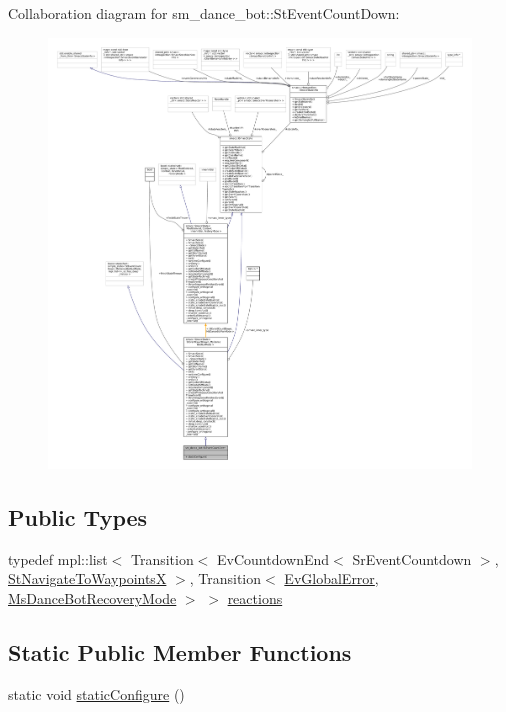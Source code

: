 Collaboration diagram for sm\+\_\+dance\+\_\+bot\+:\+:St\+Event\+Count\+Down\+:
\nopagebreak
\begin{figure}[H]
\begin{center}
\leavevmode
\includegraphics[width=350pt]{structsm__dance__bot_1_1StEventCountDown__coll__graph}
\end{center}
\end{figure}
\subsection*{Public Types}
\begin{DoxyCompactItemize}
\item 
typedef mpl\+::list$<$ Transition$<$ Ev\+Countdown\+End$<$ Sr\+Event\+Countdown $>$, \hyperlink{structsm__dance__bot_1_1StNavigateToWaypointsX}{St\+Navigate\+To\+WaypointsX} $>$, Transition$<$ \hyperlink{structsm__dance__bot_1_1EvGlobalError}{Ev\+Global\+Error}, \hyperlink{classsm__dance__bot_1_1MsDanceBotRecoveryMode}{Ms\+Dance\+Bot\+Recovery\+Mode} $>$ $>$ \hyperlink{structsm__dance__bot_1_1StEventCountDown_a19070a7928050e2ecfc234de07903c59}{reactions}
\end{DoxyCompactItemize}
\subsection*{Static Public Member Functions}
\begin{DoxyCompactItemize}
\item 
static void \hyperlink{structsm__dance__bot_1_1StEventCountDown_a6095670c25c304d3839ee3a1a24ec193}{static\+Configure} ()
\end{DoxyCompactItemize}
